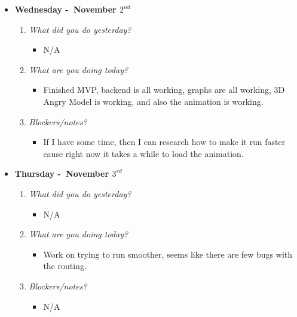 \begin{itemize}
  \item[] \textbf{\large Wednesday -\ November \(2^{nd}\)}
  \begin{enumerate}
    \item \textsl{What did you do yesterday?}
    \begin{itemize}
      \item N/A
    \end{itemize}
    \item \textsl{What are you doing today?}
    \begin{itemize}
      \item Finished MVP, backend is all working, graphs are all working, 3D Angry Model is working, and also the animation is working.
    \end{itemize}
    \item \textsl{Blockers/notes?}
    \begin{itemize}
      \item If I have some time, then I can research how to make it run faster cause right now it takes a while to load the animation.
    \end{itemize}
  \end{enumerate}
\end{itemize}
\textbf{}
\begin{itemize}
  \item[] \textbf{\large Thursday -\ November \(3^{rd}\)}
  \begin{enumerate}
    \item \textsl{What did you do yesterday?}
    \begin{itemize}
      \item N/A
    \end{itemize}
    \item \textsl{What are you doing today?}
    \begin{itemize}
      \item Work on trying to run smoother, seems like there are few bugs with the routing.
    \end{itemize}
    \item \textsl{Blockers/notes?}
    \begin{itemize}
      \item N/A
    \end{itemize}
  \end{enumerate}
\end{itemize}
\textbf{}
